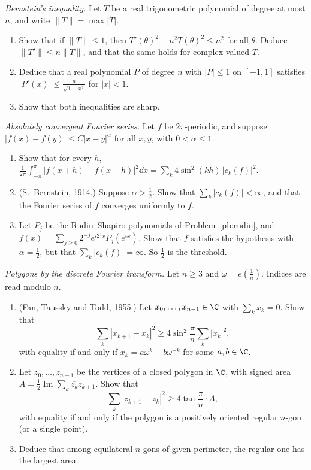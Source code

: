 \begin{exercise}[$\star\star\star$]\label{pb:bernstein}
\emph{Bernstein's inequality.} Let $T$ be a real trigonometric polynomial of degree at most $n$, and write $\|T\|=\max|T|$.
\begin{enumerate}[label=(\alph*)]
\item Show that if $\|T\|\le1$, then $T'(\theta)^2+n^2T(\theta)^2\le n^2$ for all $\theta$. Deduce $\|T'\|\le n\|T\|$, and that the same holds for
complex-valued $T$.
\item Deduce that a real polynomial $P$ of degree $n$ with $|P|\le1$ on $[-1,1]$ satisfies $|P'(x)|\le\frac n{\sqrt{1-x^2}}$ for $|x|<1$.
\item Show that both inequalities are sharp.
\end{enumerate}
\end{exercise}

\begin{exercise}[$\star\star\star$]\label{pb:bernsteinabs}
\emph{Absolutely convergent Fourier series.} Let $f$ be $2\pi$-periodic, and suppose $|f(x)-f(y)|\le C|x-y|^\alpha$ for all $x,y$, with $0<\alpha\le1$.
\begin{enumerate}[label=(\alph*)]
\item Show that for every $h$, $\frac1{2\pi}\int_{-\pi}^\pi|f(x+h)-f(x-h)|^2\dd x=\sum_k4\sin^2(kh)\,|c_k(f)|^2$.
\item (S.~Bernstein, 1914.) Suppose $\alpha>\frac12$. Show that $\sum_k|c_k(f)|<\infty$, and that the Fourier series of $f$ converges
uniformly to $f$.
\item Let $P_j$ be the Rudin--Shapiro polynomials of Problem~\ref{pb:rudin}, and $f(x)=\sum_{j\ge0}2^{-j}e^{i2^jx}P_j(e^{ix})$. Show that $f$
satisfies the hypothesis with $\alpha=\frac12$, but that $\sum_k|c_k(f)|=\infty$. So $\frac12$ is the threshold.
\end{enumerate}
\end{exercise}

\begin{exercise}[$\star\star$]\label{pb:fantaussky}
\emph{Polygons by the discrete Fourier transform.} Let $n\ge3$ and $\omega=e(\frac1n)$. Indices are read modulo $n$.
\begin{enumerate}[label=(\alph*)]
\item (Fan, Taussky and Todd, 1955.) Let $x_0,\dots,x_{n-1}\in\C$ with $\sum_kx_k=0$. Show that
\[
\sum_k|x_{k+1}-x_k|^2\ge4\sin^2\frac\pi n\sum_k|x_k|^2,
\]
with equality if and only if $x_k=a\omega^k+b\omega^{-k}$ for some $a,b\in\C$.
\item Let $z_0,\dots,z_{n-1}$ be the vertices of a closed polygon in $\C$, with signed area $A=\frac12\operatorname{Im}\sum_k\overline{z_k}z_{k+1}$. Show that
\[
\sum_k|z_{k+1}-z_k|^2\ge4\tan\frac\pi n\cdot A,
\]
with equality if and only if the polygon is a positively oriented regular $n$-gon (or a single point).
\item Deduce that among equilateral $n$-gons of given perimeter, the regular one has the largest area.
\end{enumerate}
\end{exercise}

